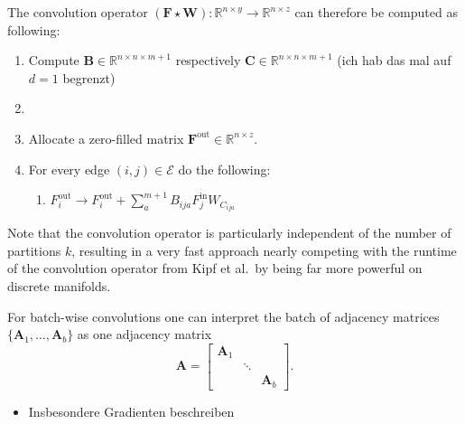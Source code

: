 \documentclass[pdftex,10pt,a4paper]{scrartcl}
\begin{document}
The convolution operator $(\mathbf{F} \star \mathbf{W}) \colon \mathbb{R}^{n \times y} \to \mathbb{R}^{n \times z}$ can therefore be computed as following:
\begin{enumerate}
  \item Compute $\mathbf{B} \in \mathbb{R}^{n \times n \times m + 1}$ respectively $\mathbf{C} \in \mathbb{R}^{n \times n \times m + 1}$ (ich hab das mal auf $d = 1$ begrenzt)
  \item
  \item Allocate a zero-filled matrix $\mathbf{F}^{\mathrm{out}} \in \mathbb{R}^{n \times z}$.
  \item For every edge $(i, j) \in \mathcal{E}$ do the following:
  \begin{enumerate}
    \item $F^{\mathrm{out}}_i \rightarrow F^{\mathrm{out}}_i + \sum_a^{m+1} B_{ija} F^{\mathrm{in}}_j W_{C_{ija}}$
  \end{enumerate}
\end{enumerate}
Note that the convolution operator is particularly independent of the number of partitions $k$, resulting in a very fast approach nearly competing with the runtime of the convolution operator from Kipf et al.\ by being far more powerful on discrete manifolds.

For batch-wise convolutions one can interpret the batch of adjacency matrices $\{ \mathbf{A}_1, \ldots, \mathbf{A}_b \}$ as one adjacency matrix
\begin{equation*}
  \mathbf{A} = \begin{bmatrix}
    \mathbf{A}_1 & & \\
    & \ddots &  \\
    & & \mathbf{A}_b
  \end{bmatrix}.
\end{equation*}









\newpage


\begin{itemize}
  \item Insbesondere Gradienten beschreiben
\end{itemize}
\end{document}
